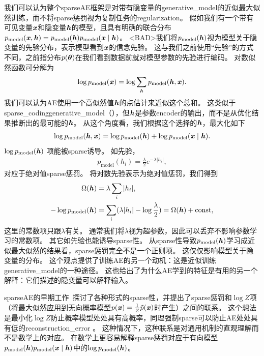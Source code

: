 
我们可以认为整个\gls{sparse}\gls{AE}框架是对带有隐变量的\gls{generative_model}的近似最大似然训练，而不将\gls{sparse}惩罚视为复制任务的\gls{regularization}。
假如我们有一个带有可见变量$\boldsymbol{\mathit{x}}$和隐变量$\boldsymbol{\mathit{h}}$的模型，且具有明确的联合分布$p_{\text{model}}(\boldsymbol{\mathit{x}},\boldsymbol{\mathit{h}})=p_{\text{model}}(\boldsymbol{\mathit{h}})p_{\text{model}} (\boldsymbol{\mathit{x}} \mid \boldsymbol{\mathit{h}})$。
<BAD>我们将$p_{\text{model}}(\boldsymbol{\mathit{h}})$视为模型关于隐变量的先验分布，表示模型看到$\boldsymbol{\mathit{x}}$的信念先验。
这与我们之前使用``先验''的方式不同，之前指分布$p(\boldsymbol{\theta})$在我们看到数据前就对模型参数的先验进行编码。
对数似然函数可分解为
\begin{align}
\log p_{\text{model}}(\boldsymbol{\mathit{x}})=\log \sum_{\boldsymbol{\mathit{h}}} p_{\text{model}}(\boldsymbol{\mathit{h}}, \boldsymbol{\mathit{x}}) .
\end{align}
我们可以认为\gls{AE}使用一个高似然值$\boldsymbol{\mathit{h}}$的点估计来近似这个总和。
这类似于\gls{sparse_coding}\gls{generative_model}（），但$\boldsymbol{\mathit{h}}$是参数\gls{encoder}的输出，而不是从优化结果推断出的最可能的$\boldsymbol{\mathit{h}}$。
从这个角度看，我们根据这个选择的$\boldsymbol{\mathit{h}}$，最大化如下
\begin{align}
\log p_{\text{model}}(\boldsymbol{\mathit{h}}, \boldsymbol{\mathit{x}})=\log p_{\text{model}}(\boldsymbol{\mathit{h}}) + \log p_{\text{model}}(\boldsymbol{\mathit{x}} \mid \boldsymbol{\mathit{h}}) .
\end{align}
$\log p_{\text{model}}(\boldsymbol{\mathit{h}}) $ 项能被\gls{sparse}诱导。
如先验，
\begin{align}
p_{\text{model}}(h_i) = \frac{\lambda}{2} e^{-\lambda | h_i |},
\end{align}
对应于绝对值\gls{sparse}惩罚。
将对数先验表示为绝对值惩罚，我们得到
\begin{align}
\Omega(\boldsymbol{\mathit{h}}) &= \lambda \sum_{i} | h_i  |,\\ 
-\log p_{\text{model}}(\boldsymbol{\mathit{h}}) &= 
\sum_i (\lambda | h_i | - \log \frac{\lambda}{2}) = \Omega(\boldsymbol{\mathit{h}}) + \text{const},
\end{align}
这里的常数项只跟$\lambda$有关。
通常我们将$\lambda$视为超参数，因此可以丢弃不影响参数学习的常数项。
其它如先验也能诱导\gls{sparse}性。
从\gls{sparse}性导致$p_{\text{model}}(\boldsymbol{\mathit{h}})$学习成近似最大似然的结果看，\gls{sparse}惩罚完全不是一个正则项。
这仅仅影响模型关于隐变量的分布。
这个观点提供了训练\gls{AE}的另一个动机：这是近似训练\gls{generative_model}的一种途径。
这也给出了为什么\gls{AE}学到的特征是有用的另一个解释：它们描述的隐变量可以解释输入。


\gls{sparse}\gls{AE}的早期工作~\citep{ranzato-07-small,ranzato-08-small}探讨了各种形式的\gls{sparse}性，并提出了\gls{sparse}惩罚和$\log  Z$项（将最大似然应用到无向概率模型$p(\boldsymbol{\mathit{x}})=\frac{1}{Z}\tilde{p}(\boldsymbol{\mathit{x}})$时产生）之间的联系。
这个想法是最小化$\log Z$防止概率模型处处具有高概率，同理强制\gls{sparse}可以防止\gls{AE}处处具有低的\gls{reconstruction_error} 。
这种情况下，这种联系是对通用机制的直观理解而不是数学上的对应。
在数学上更容易解释\gls{sparse}惩罚对应于有向模型$p_{\text{model}}(\boldsymbol{\mathit{h}})p_{\text{model}}(\boldsymbol{\mathit{x}} \mid \boldsymbol{\mathit{h}}) $中的$\log p_{\text{model}}(\boldsymbol{\mathit{h}})$。


